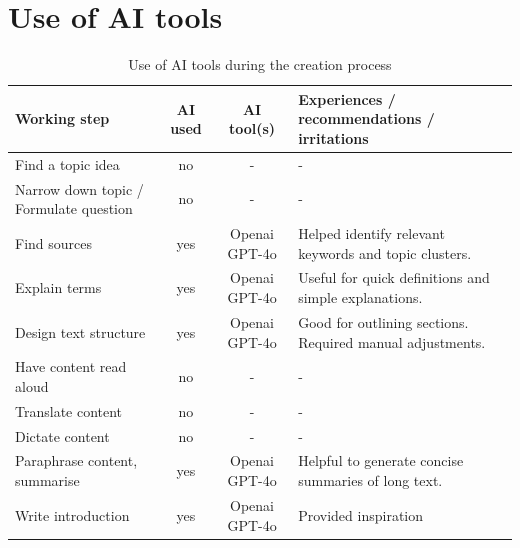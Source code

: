 \documentclass[a4paper,12pt,twoside]{scrreprt}
\begin{document}
\section{Use of AI tools}
\begin{table}[htbp]
  \centering
  \caption{Use of AI tools during the creation process}
  \label{tab:ai_usage}
  \begin{tabular}{|p{5.2cm}|c|c|p{6.2cm}|}
    \hline
    \textbf{Working step}                  & \textbf{AI used}       &
    \textbf{AI
    tool(s)}                               &
    \textbf{Experiences / recommendations / irritations}
    \\
    \hline
    Find a topic idea                      & no                     & -
                                           & -
    \\
    Narrow down topic / Formulate question & no                     & -
                                           & -
    \\
    Find sources                           & yes                    & Openai
    GPT-4o
                                           & Helped identify
    relevant keywords and topic clusters.
    \\
    Explain terms                          & yes                    & Openai
    GPT-4o
                                           & Useful for quick
    definitions and simple explanations.
    \\
    Design text structure                  & yes                    & Openai
    GPT-4o
                                           & Good for outlining
    sections. Required manual adjustments.
    \\
    Have content read aloud                & no                     & -
                                           & -
    \\
    Translate content                      & no                     & -
                                           & -
    \\
    Dictate content                        & no                     & -
                                           & -
    \\
    Paraphrase content, summarise          & yes                    & Openai
    GPT-4o
                                           & Helpful to generate
    concise summaries of long text.
    \\
    Write introduction                     & yes                    & Openai
    GPT-4o
                                           & Provided inspiration

\end{tabular}
\end{table}
\end{document}
